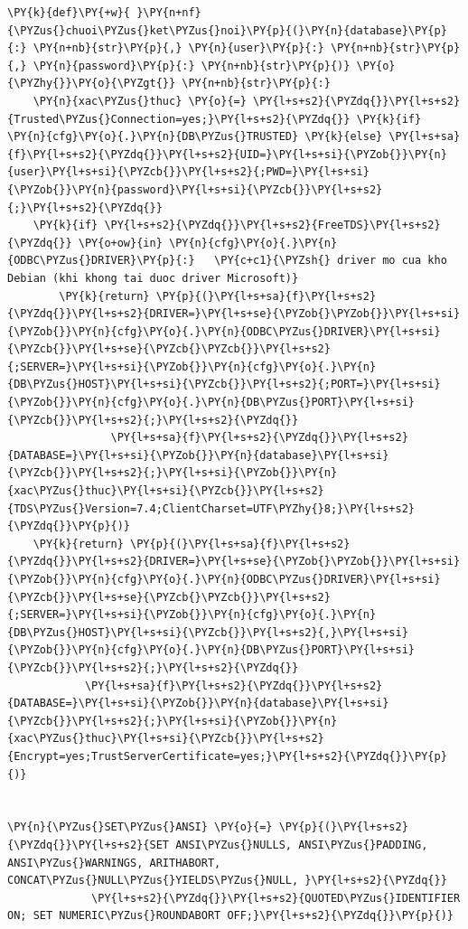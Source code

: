 \begin{Verbatim}[commandchars=\\\{\},frame=single,framerule=0.3pt,rulecolor=\color{black!40},fontsize=\footnotesize,breaklines=true]
\PY{k}{def}\PY{+w}{ }\PY{n+nf}{\PYZus{}chuoi\PYZus{}ket\PYZus{}noi}\PY{p}{(}\PY{n}{database}\PY{p}{:} \PY{n+nb}{str}\PY{p}{,} \PY{n}{user}\PY{p}{:} \PY{n+nb}{str}\PY{p}{,} \PY{n}{password}\PY{p}{:} \PY{n+nb}{str}\PY{p}{)} \PY{o}{\PYZhy{}}\PY{o}{\PYZgt{}} \PY{n+nb}{str}\PY{p}{:}
    \PY{n}{xac\PYZus{}thuc} \PY{o}{=} \PY{l+s+s2}{\PYZdq{}}\PY{l+s+s2}{Trusted\PYZus{}Connection=yes;}\PY{l+s+s2}{\PYZdq{}} \PY{k}{if} \PY{n}{cfg}\PY{o}{.}\PY{n}{DB\PYZus{}TRUSTED} \PY{k}{else} \PY{l+s+sa}{f}\PY{l+s+s2}{\PYZdq{}}\PY{l+s+s2}{UID=}\PY{l+s+si}{\PYZob{}}\PY{n}{user}\PY{l+s+si}{\PYZcb{}}\PY{l+s+s2}{;PWD=}\PY{l+s+si}{\PYZob{}}\PY{n}{password}\PY{l+s+si}{\PYZcb{}}\PY{l+s+s2}{;}\PY{l+s+s2}{\PYZdq{}}
    \PY{k}{if} \PY{l+s+s2}{\PYZdq{}}\PY{l+s+s2}{FreeTDS}\PY{l+s+s2}{\PYZdq{}} \PY{o+ow}{in} \PY{n}{cfg}\PY{o}{.}\PY{n}{ODBC\PYZus{}DRIVER}\PY{p}{:}   \PY{c+c1}{\PYZsh{} driver mo cua kho Debian (khi khong tai duoc driver Microsoft)}
        \PY{k}{return} \PY{p}{(}\PY{l+s+sa}{f}\PY{l+s+s2}{\PYZdq{}}\PY{l+s+s2}{DRIVER=}\PY{l+s+se}{\PYZob{}\PYZob{}}\PY{l+s+si}{\PYZob{}}\PY{n}{cfg}\PY{o}{.}\PY{n}{ODBC\PYZus{}DRIVER}\PY{l+s+si}{\PYZcb{}}\PY{l+s+se}{\PYZcb{}\PYZcb{}}\PY{l+s+s2}{;SERVER=}\PY{l+s+si}{\PYZob{}}\PY{n}{cfg}\PY{o}{.}\PY{n}{DB\PYZus{}HOST}\PY{l+s+si}{\PYZcb{}}\PY{l+s+s2}{;PORT=}\PY{l+s+si}{\PYZob{}}\PY{n}{cfg}\PY{o}{.}\PY{n}{DB\PYZus{}PORT}\PY{l+s+si}{\PYZcb{}}\PY{l+s+s2}{;}\PY{l+s+s2}{\PYZdq{}}
                \PY{l+s+sa}{f}\PY{l+s+s2}{\PYZdq{}}\PY{l+s+s2}{DATABASE=}\PY{l+s+si}{\PYZob{}}\PY{n}{database}\PY{l+s+si}{\PYZcb{}}\PY{l+s+s2}{;}\PY{l+s+si}{\PYZob{}}\PY{n}{xac\PYZus{}thuc}\PY{l+s+si}{\PYZcb{}}\PY{l+s+s2}{TDS\PYZus{}Version=7.4;ClientCharset=UTF\PYZhy{}8;}\PY{l+s+s2}{\PYZdq{}}\PY{p}{)}
    \PY{k}{return} \PY{p}{(}\PY{l+s+sa}{f}\PY{l+s+s2}{\PYZdq{}}\PY{l+s+s2}{DRIVER=}\PY{l+s+se}{\PYZob{}\PYZob{}}\PY{l+s+si}{\PYZob{}}\PY{n}{cfg}\PY{o}{.}\PY{n}{ODBC\PYZus{}DRIVER}\PY{l+s+si}{\PYZcb{}}\PY{l+s+se}{\PYZcb{}\PYZcb{}}\PY{l+s+s2}{;SERVER=}\PY{l+s+si}{\PYZob{}}\PY{n}{cfg}\PY{o}{.}\PY{n}{DB\PYZus{}HOST}\PY{l+s+si}{\PYZcb{}}\PY{l+s+s2}{,}\PY{l+s+si}{\PYZob{}}\PY{n}{cfg}\PY{o}{.}\PY{n}{DB\PYZus{}PORT}\PY{l+s+si}{\PYZcb{}}\PY{l+s+s2}{;}\PY{l+s+s2}{\PYZdq{}}
            \PY{l+s+sa}{f}\PY{l+s+s2}{\PYZdq{}}\PY{l+s+s2}{DATABASE=}\PY{l+s+si}{\PYZob{}}\PY{n}{database}\PY{l+s+si}{\PYZcb{}}\PY{l+s+s2}{;}\PY{l+s+si}{\PYZob{}}\PY{n}{xac\PYZus{}thuc}\PY{l+s+si}{\PYZcb{}}\PY{l+s+s2}{Encrypt=yes;TrustServerCertificate=yes;}\PY{l+s+s2}{\PYZdq{}}\PY{p}{)}


\PY{n}{\PYZus{}SET\PYZus{}ANSI} \PY{o}{=} \PY{p}{(}\PY{l+s+s2}{\PYZdq{}}\PY{l+s+s2}{SET ANSI\PYZus{}NULLS, ANSI\PYZus{}PADDING, ANSI\PYZus{}WARNINGS, ARITHABORT, CONCAT\PYZus{}NULL\PYZus{}YIELDS\PYZus{}NULL, }\PY{l+s+s2}{\PYZdq{}}
             \PY{l+s+s2}{\PYZdq{}}\PY{l+s+s2}{QUOTED\PYZus{}IDENTIFIER ON; SET NUMERIC\PYZus{}ROUNDABORT OFF;}\PY{l+s+s2}{\PYZdq{}}\PY{p}{)}



\end{Verbatim}
